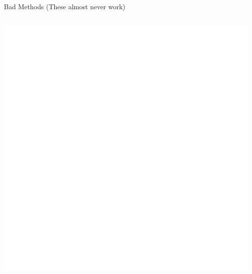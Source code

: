 \documentclass{beamer}\usepackage[]{graphicx}\usepackage[]{color}
\makeatletter
\def\maxwidth{ %
  \ifdim\Gin@nat@width>\linewidth
    \linewidth
  \else
    \Gin@nat@width
  \fi
}
\newenvironment{knitrout}{}{} %
\makeatother
\begin{document}
\begin{frame}{Bad Methods (These almost never work)}
\begin{columns}
\begin{column}{0.5\textwidth}
\begin{knitrout}
{\centering \includegraphics[width=\maxwidth]{figure/intro-unnamed-chunk-21-1} 

}


\end{knitrout}

\end{column}
\end{columns}

\end{frame}

\end{document}
